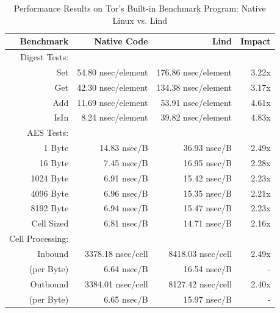 \begin{table}
\centering
\scriptsize
\begin{tabular}{|r|r|r|r|}
  \hline
  Benchmark & Native Code & Lind & Impact  \\
  \hline
  Digest Tests: & & & \\
  Set & 54.80 nsec/element & 176.86 nsec/element & 3.22x \\
  Get & 42.30 nsec/element & 134.38 nsec/element & 3.17x \\
  Add & 11.69 nsec/element & 53.91 nsec/element & 4.61x \\
  IsIn & 8.24 nsec/element & 39.82 nsec/element & 4.83x \\
  \hline
  AES Tests: & & & \\
  1 Byte & 14.83 nsec/B & 36.93 nsec/B & 2.49x \\
  16 Byte & 7.45 nsec/B & 16.95 nsec/B & 2.28x \\
  1024 Byte & 6.91 nsec/B & 15.42 nsec/B & 2.23x \\
  4096 Byte & 6.96 nsec/B & 15.35 nsec/B & 2.21x \\
  8192 Byte & 6.94 nsec/B & 15.47 nsec/B & 2.23x \\
  Cell Sized & 6.81 nsec/B & 14.71 nsec/B & 2.16x \\
  \hline
  Cell Processing: & & & \\
  Inbound & 3378.18 nsec/cell & 8418.03 nsec/cell & 2.49x \\
  (per Byte) & 6.64 nsec/B & 16.54 nsec/B & - \\
  Outbound & 3384.01 nsec/cell & 8127.42 nsec/cell & 2.40x \\
  (per Byte) & 6.65 nsec/B & 15.97 nsec/B & - \\
  \hline
\end{tabular}
\caption{Performance Results on Tor's Built-in Benchmark Program: Native
Linux vs. Lind }
\label{table:performance_tor}
\end{table}

